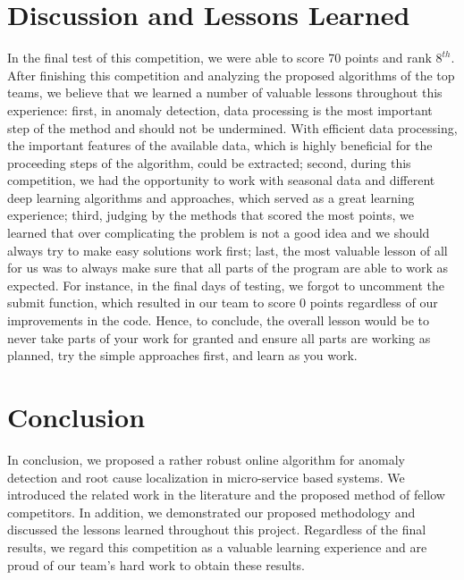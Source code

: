 \documentclass[12pt]{article}
\begin{document}
\section{Discussion and Lessons Learned}
In the final test of this competition, we were able to score 70 points and rank $8^{th}$. After finishing this competition and analyzing the proposed algorithms of the top teams, we believe that we learned a number of valuable lessons throughout this experience: first, in anomaly detection, data processing is the most important step of the method and should not be undermined. With efficient data processing, the important features of the available data, which is highly beneficial for the proceeding steps of the algorithm, could be extracted; second, during this competition, we had the opportunity to work with seasonal data and different deep learning algorithms and approaches, which served as a great learning experience; third, judging by the methods that scored the most points, we learned that over complicating the problem is not a good idea and we should always try to make easy solutions work first; last, the most valuable lesson of all for us was to always make sure that all parts of the program are able to work as expected. For instance, in the final days of testing, we forgot to uncomment the submit function, which resulted in our team to score 0 points regardless of our improvements in the code. Hence, to conclude, the overall lesson would be to never take parts of your work for granted and ensure all parts are working as planned, try the simple approaches first, and learn as you work. 
\section{Conclusion}
In conclusion, we proposed a rather robust online algorithm for anomaly detection and root cause localization in micro-service based systems. We introduced the related work in the literature and the proposed method of fellow competitors. In addition, we demonstrated our proposed methodology and discussed the lessons learned throughout this project. Regardless of the final results, we regard this competition as a valuable learning experience and are proud of our team's hard work to obtain these results. 
\end{document}
